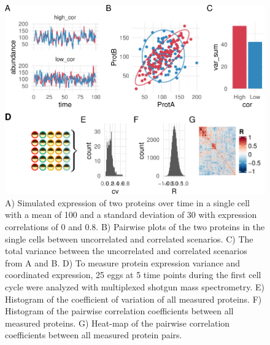 \documentclass[11pt,]{article}
\begin{document}
\begin{figure}
\centering
\includegraphics{output/figures/figure_1-1.pdf}
\caption{A) Simulated expression of two proteins over time in a single
cell with a mean of 100 and a standard deviation of 30 with expression
correlations of 0 and 0.8. B) Pairwise plots of the two proteins in the
single cells between uncorrelated and correlated scenarios. C) The total
variance between the uncorrelated and correlated scenarios from A and B.
D) To measure protein expression variance and coordinated expression, 25
eggs at 5 time points during the first cell cycle were analyzed with
multiplexed shotgun mass spectrometry. E) Histogram of the coefficient
of variation of all measured proteins. F) Histogram of the pairwise
correlation coefficients between all measured proteins. G) Heat-map of
the pairwise correlation coefficients between all measured protein
pairs.}
\end{figure}

\newpage
\end{document}

